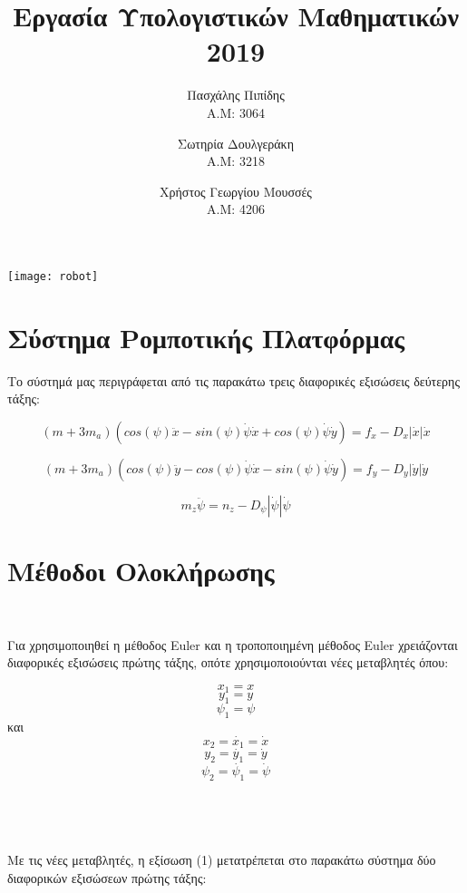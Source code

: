 \documentclass{article}
\begin{document}
 
\title{Εργασία Υπολογιστικών Μαθηματικών 2019}
\author{Πασχάλης Πιπίδης\\A.M: 3064
\and
Σωτηρία Δουλγεράκη\\A.M: 3218
\and
Χρήστος Γεωργίου Μουσσές\\A.M: 4206
}
\date{}

\maketitle
\texttt{[image: robot]}

\newpage
\tableofcontents
\newpage

\section{Σύστημα Ρομποτικής Πλατφόρμας}

Το σύστημά μας περιγράφεται από τις παρακάτω τρεις διαφορικές εξισώσεις δεύτερης τάξης: 

\begin{equation}
(m + 3m_a)(cos(\psi)\ddot{x} - sin(\psi)\dot{\psi}\dot{x} + cos(\psi)\dot{\psi}\dot{y}) = f_x - D_x|\dot{x}|\dot{x}
\end{equation}

\begin{equation}
(m + 3m_a)(cos(\psi)\ddot{y} - cos(\psi)\dot{\psi}\dot{x} - sin(\psi)\dot{\psi}\dot{y}) = f_y - D_y|\dot{y}|\dot{y}
\end{equation}

\begin{equation}
m_z\ddot{\psi} = n_z - D_\psi|\dot{\psi}|\dot{\psi}
\end{equation}

\section{Μέθοδοι Ολοκλήρωσης}\

Για χρησιμοποιηθεί η μέθοδος Euler και η τροποποιημένη μέθοδος Euler χρειάζονται διαφορικές εξισώσεις πρώτης τάξης, οπότε χρησιμοποιούνται νέες μεταβλητές όπου:

\[
x_1 = x
\]
\[
y_1 = y
\]
\[
\psi_1 = \psi
\]
και
\[
x_2 = \dot{x_1} = \dot{x} 
\]
\[
y_2 = \dot{y_1} = \dot{y} 
\]
\[
\psi_2 = \dot{\psi_1} = \dot{\psi} 
\]
\\\\\\\\
Με τις νέες μεταβλητές, η εξίσωση (1) μετατρέπεται στο παρακάτω σύστημα δύο διαφορικών εξισώσεων πρώτης τάξης:
\end{document}
